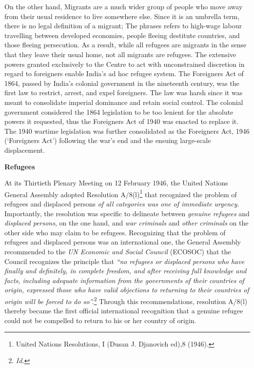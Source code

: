 \begin{multicols}{2}
\noi
On the other hand, Migrants are a much wider group of people who move away from their
usual residence to live somewhere else. Since it is an umbrella term, there is no legal
definition of a migrant; The phrases refers to high-wage labour travelling between developed
economies, people fleeing destitute countries, and those fleeing persecution. As a result,
while all refugees are migrants in the sense that they leave their usual home, not all migrants
are refugees. The extensive powers granted exclusively to the Centre to act with
unconstrained discretion in regard to foreigners enable India's ad hoc refugee system. The
Foreigners Act of 1864, passed by India's colonial government in the nineteenth century, was
the first law to restrict, arrest, and expel foreigners. The law was harsh since it was meant to
consolidate imperial dominance and retain social control. The colonial government
considered the 1864 legislation to be too lenient for the absolute powers it requested, thus the
Foreigners Act of 1940 was enacted to replace it. The 1940 wartime legislation was further
consolidated as the Foreigners Act, 1946 (‘Foreigners Act') following the war's end and the
ensuing large-scale displacement.


\vspace{-.2cm}

\noi
{\normalsize\bfseries {Refugees}}

\vspace{-.2cm}

\noi
At its Thirtieth Plenary Meeting on 12 February 1946, the United Nations General Assembly
adopted Resolution A/8(l)\footnote{United Nations Resolutions, I (Dusan J. Djanovich ed),8 (1946).} that recognized the problem of refugees and displaced persons \textit{of
all categories was one of immediate urgency.} Importantly, the resolution was specific to
delineate between \textit{genuine refugees} and \textit{displaced persons}, on the one hand, and \textit{war
criminals} and \textit{other criminals} on the other side who may claim to be refugees.
Recognizing that the problem of refugees and displaced persons was an international one, the
General Assembly recommended to the \textit{UN Economic and Social Council} (ECOSOC) that the
Council recognizes the principle that \textit{“no refugees or displaced persons who have finally and
definitely, in complete freedom, and after receiving full knowledge and facts, including
adequate information from the governments of their countries of origin, expressed those who
have valid objections to returning to their countries of origin will be forced to do so”.}\footnote{\textit{Id.}}
Through this recommendations, resolution A/8(l) thereby became the first official
international recognition that a genuine refugee could not be compelled to return to his or her
country of origin. 


\end{multicols}
